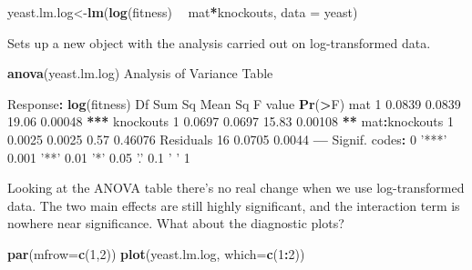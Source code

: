 \documentclass[
]{book}
\newenvironment{Shaded}{\begin{snugshade}}{\end{snugshade}}
\newcommand{\DataTypeTok}[1]{\textcolor[rgb]{0.13,0.29,0.53}{#1}}
\newcommand{\DecValTok}[1]{\textcolor[rgb]{0.00,0.00,0.81}{#1}}
\newcommand{\ErrorTok}[1]{\textcolor[rgb]{0.64,0.00,0.00}{\textbf{#1}}}
\newcommand{\FloatTok}[1]{\textcolor[rgb]{0.00,0.00,0.81}{#1}}
\newcommand{\KeywordTok}[1]{\textcolor[rgb]{0.13,0.29,0.53}{\textbf{#1}}}
\newcommand{\NormalTok}[1]{#1}
\newcommand{\OperatorTok}[1]{\textcolor[rgb]{0.81,0.36,0.00}{\textbf{#1}}}
\newcommand{\StringTok}[1]{\textcolor[rgb]{0.31,0.60,0.02}{#1}}
\begin{document}
\begin{Shaded}
\begin{Highlighting}[]
\NormalTok{yeast.lm.log<-}\KeywordTok{lm}\NormalTok{(}\KeywordTok{log}\NormalTok{(fitness) }\OperatorTok{~}\StringTok{ }\NormalTok{mat}\OperatorTok{*}\NormalTok{knockouts, }\DataTypeTok{data =}\NormalTok{ yeast)}
\end{Highlighting}
\end{Shaded}

Sets up a new object with the analysis carried out on log-transformed data.

\begin{Shaded}
\begin{Highlighting}[]
\KeywordTok{anova}\NormalTok{(yeast.lm.log)}
\NormalTok{Analysis of Variance Table}

\NormalTok{Response}\OperatorTok{:}\StringTok{ }\KeywordTok{log}\NormalTok{(fitness)}
\NormalTok{              Df Sum Sq Mean Sq F value  }\KeywordTok{Pr}\NormalTok{(}\OperatorTok{>}\NormalTok{F)    }
\NormalTok{mat            }\DecValTok{1} \FloatTok{0.0839}  \FloatTok{0.0839}   \FloatTok{19.06} \FloatTok{0.00048} \OperatorTok{**}\ErrorTok{*}
\NormalTok{knockouts      }\DecValTok{1} \FloatTok{0.0697}  \FloatTok{0.0697}   \FloatTok{15.83} \FloatTok{0.00108} \OperatorTok{**}\StringTok{ }
\NormalTok{mat}\OperatorTok{:}\NormalTok{knockouts  }\DecValTok{1} \FloatTok{0.0025}  \FloatTok{0.0025}    \FloatTok{0.57} \FloatTok{0.46076}    
\NormalTok{Residuals     }\DecValTok{16} \FloatTok{0.0705}  \FloatTok{0.0044}                    
\OperatorTok{---}
\NormalTok{Signif. codes}\OperatorTok{:}\StringTok{  }\DecValTok{0} \StringTok{'***'} \FloatTok{0.001} \StringTok{'**'} \FloatTok{0.01} \StringTok{'*'} \FloatTok{0.05} \StringTok{'.'} \FloatTok{0.1} \StringTok{' '} \DecValTok{1}
\end{Highlighting}
\end{Shaded}

Looking at the ANOVA table there's no real change when we use log-transformed data. The two main effects are still highly significant, and the interaction term is nowhere near significance. What about the diagnostic plots?

\begin{Shaded}
\begin{Highlighting}[]
\KeywordTok{par}\NormalTok{(}\DataTypeTok{mfrow=}\KeywordTok{c}\NormalTok{(}\DecValTok{1}\NormalTok{,}\DecValTok{2}\NormalTok{))}
\KeywordTok{plot}\NormalTok{(yeast.lm.log, }\DataTypeTok{which=}\KeywordTok{c}\NormalTok{(}\DecValTok{1}\OperatorTok{:}\DecValTok{2}\NormalTok{))}
\end{Highlighting}
\end{Shaded}
\end{document}
